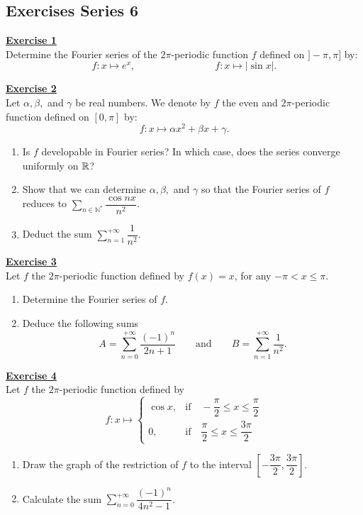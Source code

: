 \subsection{Exercises Series 6}
\vspace*{0.2cm}
\noindent\Large{\underline{\textbf{Exercise 1}}}
\normalsize{}\\
\noindent Determine the Fourier series of the $2\pi$-periodic function $f$ defined on $]-\pi,\pi]$ by:
$$f : x \longmapsto e^x, \qquad \qquad \qquad \qquad f : x \longmapsto |\sin x|.$$

\noindent\Large{\underline{\textbf{Exercise 2}}}
\normalsize{}\\
\noindent Let $\alpha, \beta,$ and $\gamma$ be real numbers. 
We denote by $f$ the even and $2\pi$-periodic function defined on $[0, \pi]$ by:
$$f : x \longmapsto \alpha x^2 + \beta x + \gamma.$$
\begin{enumerate}
    \item Is $f$ developable in Fourier series?
          In which case, does the series converge uniformly on $\mathbb{R}$?
    \item Show that we can determine $\alpha, \beta,$ and $\gamma$ so that the Fourier series of $f$ reduces to
            $\displaystyle\sum_{n \in \mathbb{N}^*} \dfrac{\cos nx}{n^2}$.
    \item Deduct the sum $\displaystyle\sum_{n=1}^{+\infty} \dfrac{1}{n^2}$.\\
\end{enumerate}

\noindent\Large{\underline{\textbf{Exercise 3}}}
\normalsize{}\\
\noindent Let $f$ the $2\pi$-periodic function defined by $f(x) = x$, for any $-\pi < x \leq \pi$. 
\begin{enumerate}
    \item Determine the Fourier series of $f$.
    \item Deduce the following sums
    $$A = \sum_{n=0}^{+\infty} \dfrac{(-1)^n}{2n+1} \qquad \text{and} \qquad B = \sum_{n=1}^{+\infty} \dfrac{1}{n^2}.$$
\end{enumerate}

\noindent\Large{\underline{\textbf{Exercise 4}}}
\normalsize{}\\
\noindent Let $f$ the $2\pi$-periodic function defined by
    $$f : x \longmapsto 
    \begin{cases} 
        \cos x, & \text{if} \quad 
        -\dfrac{\pi}{2} \leq x \leq \dfrac{\pi}{2} \\[6pt] 0, & \text{if} \quad 
        \dfrac{\pi}{2} \leq x \leq \dfrac{3\pi}{2} 
    \end{cases}$$
\begin{enumerate}
    \item Draw the graph of the restriction of $f$ to the interval $\left[-\dfrac{3\pi}{2}, \dfrac{3\pi}{2}\right]$.
    \item Calculate the sum $\displaystyle\sum_{n=0}^{+\infty} \dfrac{(-1)^n}{4n^2 - 1}$.\\
\end{enumerate}

